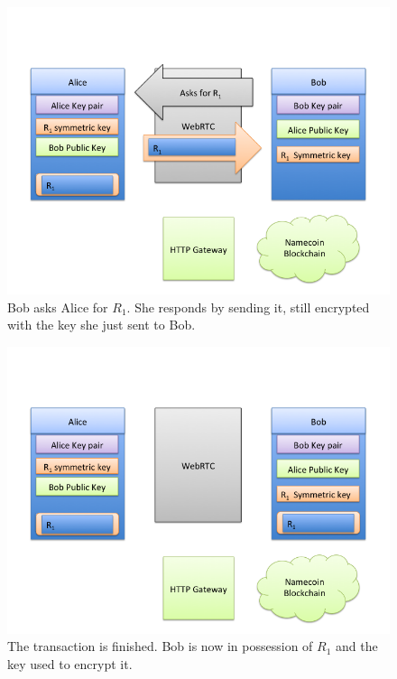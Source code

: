 \begin{figure}[h]
\centering
\includegraphics[width=\textwidth,height=0.2\paperheight,keepaspectratio
]{slides/Slide5.png}
\caption{Bob asks Alice for $R_1$. She responds by sending it, still encrypted with the key she just sent to Bob.}
\label{fig:slide5}
\end{figure}
\begin{figure}[h]
\centering
\includegraphics[width=\textwidth,height=0.2\paperheight,keepaspectratio
]{slides/Slide6.png}
\caption{The transaction is finished. Bob is now in possession of $R_1$ and the key used to encrypt it.}
\label{fig:slide6}
\end{figure}
